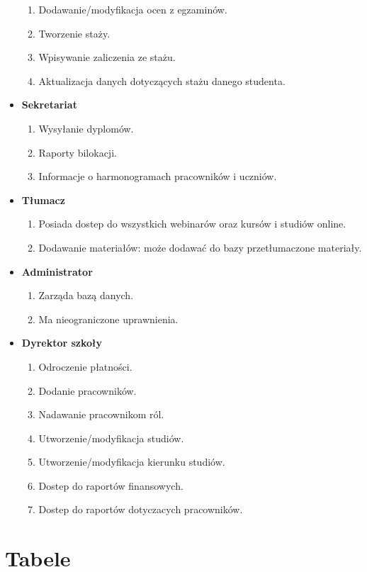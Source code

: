\documentclass[11pt]{article}
\begin{document}
\begin{itemize}
\begin{enumerate}
\item Dodawanie/modyfikacja ocen z egzaminów.
\item Tworzenie staży.
\item Wpisywanie zaliczenia ze stażu.
\item Aktualizacja danych dotyczących stażu danego studenta.
\end{enumerate}
\item \textbf{Sekretariat}
\begin{enumerate}
\item Wysyłanie dyplomów.
\item Raporty bilokacji.
\item Informacje o harmonogramach pracowników i uczniów.
\end{enumerate}
\item \textbf{Tłumacz}
\begin{enumerate}
\item Posiada dostep do wszystkich webinarów oraz kursów i studiów online.
\item Dodawanie materiałów: może dodawać do bazy przetłumaczone materiały.
\end{enumerate}
\item \textbf{Administrator}
\begin{enumerate}
\item Zarząda bazą danych.
\item Ma nieograniczone uprawnienia.
\end{enumerate}
\item \textbf{Dyrektor szkoły}
\begin{enumerate}
\item Odroczenie płatności.
\item Dodanie pracowników.
\item Nadawanie pracownikom ról.
\item Utworzenie/modyfikacja studiów.
\item Utworzenie/modyfikacja kierunku studiów.
\item Dostep do raportów finansowych.
\item Dostep do raportów dotyczacych pracowników.
\end{enumerate}
\end{itemize}
\section{Tabele}
\label{sec:org3ff74e5}
\end{document}
